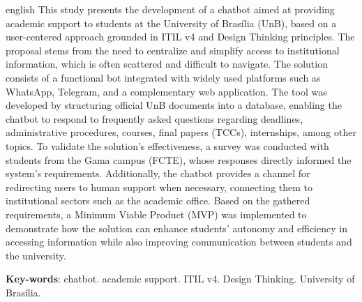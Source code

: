 \begin{resumo}[Abstract]
 \begin{otherlanguage*}{english}
This study presents the development of a chatbot aimed at providing academic support to students at the University of Brasília (UnB), based on a user-centered approach grounded in ITIL v4 and Design Thinking principles. The proposal stems from the need to centralize and simplify access to institutional information, which is often scattered and difficult to navigate. The solution consists of a functional bot integrated with widely used platforms such as WhatsApp, Telegram, and a complementary web application. The tool was developed by structuring official UnB documents into a database, enabling the chatbot to respond to frequently asked questions regarding deadlines, administrative procedures, courses, final papers (TCCs), internships, among other topics. To validate the solution’s effectiveness, a survey was conducted with students from the Gama campus (FCTE), whose responses directly informed the system’s requirements. Additionally, the chatbot provides a channel for redirecting users to human support when necessary, connecting them to institutional sectors such as the academic office. Based on the gathered requirements, a Minimum Viable Product (MVP) was implemented to demonstrate how the solution can enhance students' autonomy and efficiency in accessing information while also improving communication between students and the university.

   \vspace{\onelineskip}
 
   \noindent 
   \textbf{Key-words}: chatbot. academic support. ITIL v4. Design Thinking. University of Brasília.
 \end{otherlanguage*}
\end{resumo}
